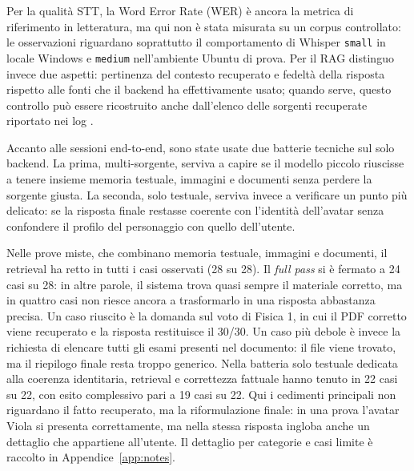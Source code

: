 Per la qualità STT, la Word Error Rate (WER) è ancora la metrica di riferimento in letteratura, ma qui non è stata misurata su un corpus controllato: le osservazioni riguardano soprattutto il comportamento di Whisper \texttt{small} in locale Windows e \texttt{medium} nell'ambiente Ubuntu di prova. Per il RAG distinguo invece due aspetti: pertinenza del contesto recuperato e fedeltà della risposta rispetto alle fonti che il backend ha effettivamente usato; quando serve, questo controllo può essere ricostruito anche dall'elenco delle sorgenti recuperate riportato nei log \cite{gao2024ragsurvey,Radford2023Whisper}.

Accanto alle sessioni end-to-end, sono state usate due batterie tecniche sul solo backend. La prima, multi-sorgente, serviva a capire se il modello piccolo riuscisse a tenere insieme memoria testuale, immagini e documenti senza perdere la sorgente giusta. La seconda, solo testuale, serviva invece a verificare un punto più delicato: se la risposta finale restasse coerente con l'identità dell'avatar senza confondere il profilo del personaggio con quello dell'utente.

Nelle prove miste, che combinano memoria testuale, immagini e documenti, il retrieval ha retto in tutti i casi osservati (28 su 28). Il \emph{full pass} si è fermato a 24 casi su 28: in altre parole, il sistema trova quasi sempre il materiale corretto, ma in quattro casi non riesce ancora a trasformarlo in una risposta abbastanza precisa. Un caso riuscito è la domanda sul voto di Fisica 1, in cui il PDF corretto viene recuperato e la risposta restituisce il 30/30. Un caso più debole è invece la richiesta di elencare tutti gli esami presenti nel documento: il file viene trovato, ma il riepilogo finale resta troppo generico. Nella batteria solo testuale dedicata alla coerenza identitaria, retrieval e correttezza fattuale hanno tenuto in 22 casi su 22, con esito complessivo pari a 19 casi su 22. Qui i cedimenti principali non riguardano il fatto recuperato, ma la riformulazione finale: in una prova l'avatar Viola si presenta correttamente, ma nella stessa risposta ingloba anche un dettaglio che appartiene all'utente. Il dettaglio per categorie e casi limite è raccolto in Appendice~\ref{app:notes}.

